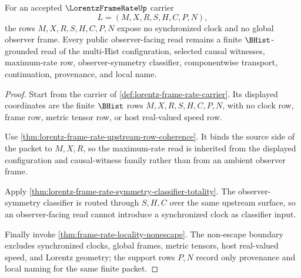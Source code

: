 \begin{theorem}
\label{thm:lorentz-frame-rate-observer-clock-refusal}
For an accepted $\LorentzFrameRateUp$ carrier
$$
L=(M,X,R,S,H,C,P,N),
$$
the rows $M,X,R,S,H,C,P,N$ expose no synchronized clock and no global observer frame. Every public observer-facing read remains a finite $\BHist$-grounded read of the multi-Hist configuration, selected causal witnesses, maximum-rate row, observer-symmetry classifier, componentwise transport, continuation, provenance, and local name.
\end{theorem}
\begin{proof}
Start from the carrier of \autoref{def:lorentz-frame-rate-carrier}. Its displayed coordinates are the finite $\BHist$ rows $M,X,R,S,H,C,P,N$, with no clock row, frame row, metric tensor row, or host real-valued speed row.

Use \autoref{thm:lorentz-frame-rate-upstream-row-coherence}. It binds the source side of the packet to $M,X,R$, so the maximum-rate read is inherited from the displayed configuration and causal-witness family rather than from an ambient observer frame.

Apply \autoref{thm:lorentz-frame-rate-symmetry-classifier-totality}. The observer-symmetry classifier is routed through $S,H,C$ over the same upstream surface, so an observer-facing read cannot introduce a synchronized clock as classifier input.

Finally invoke \autoref{thm:frame-rate-locality-nonescape}. The non-escape boundary excludes synchronized clocks, global frames, metric tensors, host real-valued speed, and Lorentz geometry; the support rows $P,N$ record only provenance and local naming for the same finite packet.
\end{proof}

